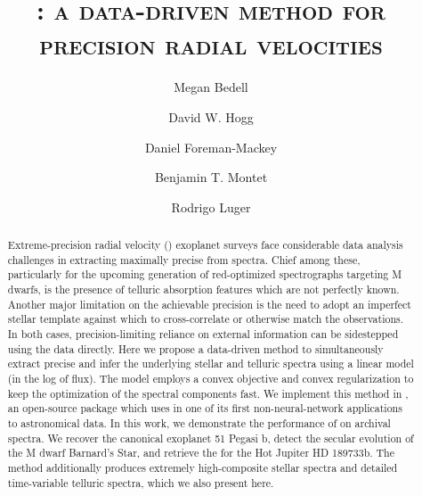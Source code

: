 \documentclass[twocolumn]{aastex62}
\newcommand{\Mdwarf}{Barnard's Star\xspace} %
\begin{document}
\sloppy\sloppypar\raggedbottom\frenchspacing %

\shorttitle{\wobble}

\graphicspath{ {figures/} }


\title{\textsc{\wobble: a data-driven method for precision radial velocities}}

\author[0000-0001-9907-7742]{Megan Bedell}
\affiliation{\flatiron}

\author[0000-0003-2866-9403]{David W. Hogg}
\affiliation{\flatiron}

\author[0000-0002-9328-5652]{Daniel Foreman-Mackey}
\affiliation{\flatiron}

\author[0000-0001-7516-8308]{Benjamin T. Montet}
\affiliation{\chicago}

\author[0000-0002-0296-3826]{Rodrigo Luger}
\affiliation{\flatiron}


\begin{abstract}
Extreme-precision radial velocity (\EPRV) exoplanet surveys face considerable data analysis challenges in extracting maximally precise \RVs from spectra. 
Chief among these, particularly for the upcoming generation of red-optimized spectrographs targeting M dwarfs, is the presence of telluric absorption features which are not perfectly known. 
Another major limitation on the achievable \RV precision is the need to adopt an imperfect stellar template against which to cross-correlate or otherwise match the observations. 
In both cases, precision-limiting reliance on external information can be sidestepped using the data directly. 
Here we propose a data-driven method to simultaneously extract precise \RVs and infer the underlying stellar and telluric spectra using a linear model (in the log of flux). 
The model employs a convex objective and convex regularization to keep the optimization of the spectral components fast. 
We implement this method in \wobble, an open-source \python package which uses \TF in one of its first non-neural-network applications to astronomical data. 
In this work, we demonstrate the performance of \wobble on archival \HARPS spectra.
We recover the canonical exoplanet 51 Pegasi b, detect the secular \RV evolution of the M dwarf \Mdwarf, and retrieve the \RM for the Hot Jupiter HD 189733b. 
The method additionally produces extremely high-\SNR composite stellar spectra and detailed time-variable telluric spectra, which we also present here. 
\end{abstract}
\end{document}
